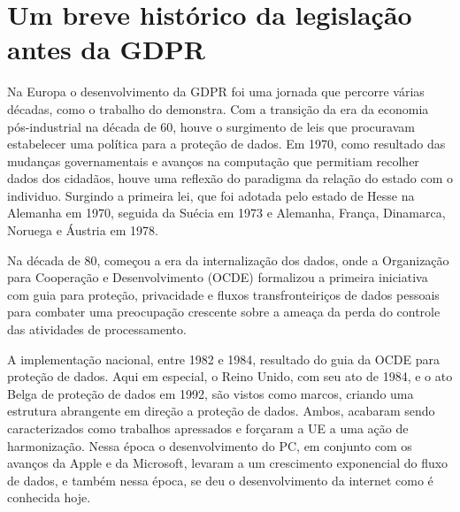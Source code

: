 
\section{Um breve histórico da legislação antes da GDPR}

Na Europa o desenvolvimento da GDPR foi uma jornada que percorre várias décadas, como o trabalho do \citet{Schwerin2018} demonstra. Com a transição da era da economia pós-industrial na década de 60, houve o surgimento de leis que procuravam estabelecer uma política para a proteção de dados. Em 1970, como resultado das mudanças governamentais e avanços na computação que permitiam recolher dados dos cidadãos, houve uma reflexão do paradigma da relação do estado com o individuo. Surgindo a primeira lei, que foi adotada pelo estado de Hesse na Alemanha em 1970, seguida da Suécia em 1973 e Alemanha, França, Dinamarca, Noruega e Áustria em 1978.

Na década de 80, começou a era da internalização dos dados, onde a Organização para Cooperação e Desenvolvimento (OCDE) formalizou a primeira iniciativa com guia para proteção, privacidade e fluxos transfronteiriços de dados pessoais para combater uma preocupação crescente sobre a ameaça da perda do controle das atividades de processamento.

A implementação nacional, entre 1982 e 1984, resultado do guia da OCDE para proteção de dados. Aqui em especial, o Reino Unido, com seu ato de 1984, e o ato Belga de proteção de dados em 1992, são vistos como marcos, criando uma estrutura abrangente em direção a proteção de dados. Ambos, acabaram sendo caracterizados como trabalhos apressados e forçaram a UE a uma ação de harmonização. Nessa época o desenvolvimento do PC, em conjunto com os avanços da Apple e da Microsoft, levaram a um crescimento exponencial do fluxo de dados, e também nessa época, se deu o desenvolvimento da internet como é conhecida hoje.

